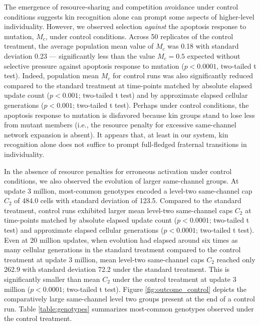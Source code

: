 The emergence of resource-sharing and competition avoidance under control conditions suggests kin recognition alone can prompt some aspects of higher-level individuality.
However, we observed selection \textit{against} the apoptosis response to mutation, $M_{c}$, under control conditions.
Across 50 replicates of the control treatment, the average population mean value of $M_{c}$ was 0.18 with standard deviation 0.23 --- significantly less than the value $M_{c} = 0.5$ expected without selective pressure against apoptosis response to mutation ($p < 0.0001$, two-tailed t test).
Indeed, population mean $M_{c}$ for control runs was also significantly reduced compared to the standard treatment at time-points matched by absolute elapsed update count ($p < 0.001$; two-tailed t test) and by approximate elapsed cellular generations ($p < 0.001$; two-tailed t test).
Perhaps under control conditions, the apoptosis response to mutation is disfavored because kin groups stand to lose less from mutant members (i.e., the resource penalty for excessive same-channel network expansion is absent).
It appears that, at least in our system, kin recognition alone does not suffice to prompt full-fledged fraternal transitions in individuality.

In the absence of resource penalties for erroneous activation under control conditions, we also observed the evolution of larger same-channel groups.
At update 3 million, most-common genotypes encoded a level-two same-channel cap $C_2$ of 484.0 cells with standard deviation of 123.5.
Compared to the standard treatment, control runs exhibited larger mean level-two same-channel caps $C_2$ at time-points matched by absolute elapsed update count ($p < 0.0001$; two-tailed t test) and approximate elapsed cellular generations ($p < 0.0001$; two-tailed t test).
Even at 20 million updates, when evolution had elapsed around six times as many cellular generations in the standard treatment compared to the control treatment at update 3 million, mean level-two same-channel caps $C_2$ reached only 262.9 with standard deviation 72.2 under the standard treatment.
This is significantly smaller than mean $C_2$ under the control treatment at update 3 million ($p < 0.0001$; two-tailed t test).
Figure \ref{fig:outcome_control} depicts the comparatively large same-channel level two groups present at the end of a control run.
Table \ref{table:genotypes} summarizes most-common genotypes observed under the control treatment.
